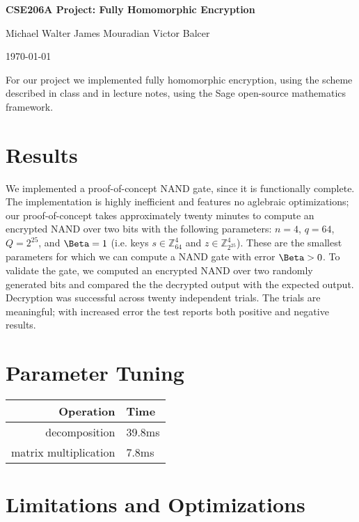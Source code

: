\documentclass{article}
\begin{document}
\centerline{\LARGE{\bf{CSE206A Project: Fully Homomorphic Encryption}}}
\vspace{12.0pt}
\centerline{Michael Walter \hspace{0.1in} James Mouradian \hspace{0.1in} Victor Balcer}
\vspace{4.0pt}
\centerline{\today}

For our project we implemented fully homomorphic encryption, using the scheme
described in class and in lecture notes, using the Sage open-source mathematics
framework.

\section{Results}

We implemented a proof-of-concept NAND gate, since it is functionally complete.
The implementation is highly inefficient and features no aglebraic
optimizations; our proof-of-concept takes approximately twenty minutes to
compute an encrypted NAND over two bits with the following parameters: $n=4$,
$q=64$, $Q=2^{25}$, and $\Beta=1$ (i.e. keys $s\in \mathbb{Z}_{64}^4$ and
$z\in\mathbb{Z}_{2^{25}}^4$). These are the smallest parameters for which we
can compute a NAND gate with error $\Beta > 0$. To validate the gate, we
computed an encrypted NAND over two randomly generated bits and compared the
the decrypted output with the expected output. Decryption was successful across
twenty independent trials. The trials are meaningful; with increased error
the test reports both positive and negative results.

\section{Parameter Tuning}


\begin{tabular}{r   l}
\textbf{Operation} & \textbf{Time} \\
\hline
decomposition & 39.8ms \\
matrix multiplication & 7.8ms \\
\end{tabular}


\section{Limitations and Optimizations}
\end{document}
